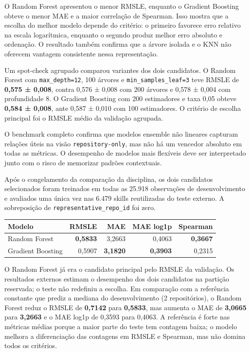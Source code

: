 O Random Forest apresentou o menor RMSLE, enquanto o Gradient Boosting
obteve o menor MAE e a maior correlação de Spearman. Isso mostra que a
escolha do melhor modelo depende do critério: o primeiro favorece erro
relativo na escala logarítmica, enquanto o segundo produz melhor erro
absoluto e ordenação. O resultado também confirma que a árvore isolada e
o KNN não oferecem vantagem consistente nessa representação.

Um spot-check agrupado comparou variantes dos dois candidatos. O Random
Forest com \texttt{max\_depth=12}, 100 árvores e
\texttt{min\_samples\_leaf=3} teve RMSLE de \textbf{0,575 ± 0,008},
contra 0,576 ± 0,008 com 200 árvores e 0,578 ± 0,004 com profundidade 8.
O Gradient Boosting com 200 estimadores e taxa 0,05 obteve \textbf{0,584
± 0,008}, ante 0,587 ± 0,010 com 100 estimadores. O critério de escolha
principal foi o RMSLE médio da validação agrupada.

O benchmark completo confirma que modelos ensemble não lineares capturam
relações úteis na visão \texttt{repository-only}, mas não há um vencedor
absoluto em todas as métricas. O desempenho de modelos mais flexíveis
deve ser interpretado junto com o risco de memorizar padrões
contextuais.

Após o congelamento da comparação da disciplina, os dois candidatos
selecionados foram treinados em todas as 25.918 observações de
desenvolvimento e avaliados uma única vez nas 6.479 skills reutilizadas
do teste externo. A sobreposição de \texttt{representative\_repo\_id}
foi zero.

\begin{longtable}[]{@{}lrrrr@{}}
\toprule\noalign{}
Modelo & RMSLE & MAE & MAE log1p & Spearman \\
\midrule\noalign{}
\endhead
\bottomrule\noalign{}
\endlastfoot
Random Forest & \textbf{0,5833} & 3,2663 & 0,4063 & \textbf{0,3667} \\
Gradient Boosting & 0,5907 & \textbf{3,1820} & \textbf{0,3903} &
0,2315 \\
\end{longtable}

O Random Forest já era o candidato principal pelo RMSLE da validação. Os
resultados externos estimam o desempenho dos dois candidatos na partição
reservada; o teste não redefiniu a escolha. Em comparação com a
referência constante que prediz a mediana do desenvolvimento (2
repositórios), o Random Forest reduz o RMSLE de \textbf{0,7142} para
\textbf{0,5833}, mas aumenta o MAE de \textbf{3,0665} para
\textbf{3,2663} e o MAE log1p de 0,3593 para 0,4063. A referência é
forte nas métricas médias porque a maior parte do teste tem contagem
baixa; o modelo melhora a diferenciação das contagens em RMSLE e
Spearman, mas não domina todos os critérios.

